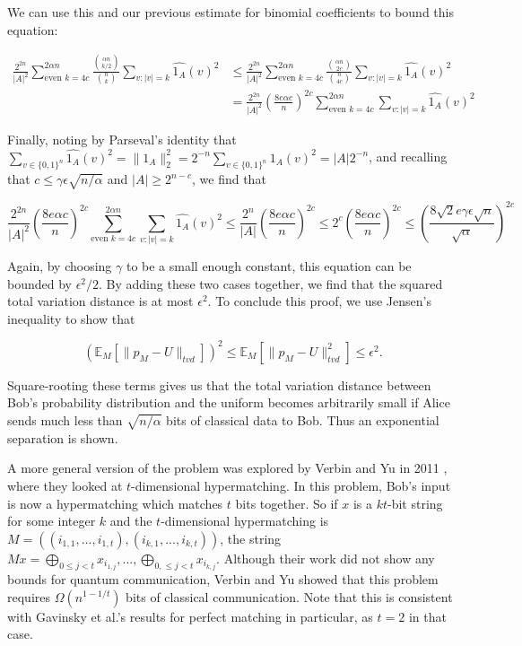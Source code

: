 \documentclass[a4paper]{article}
\begin{document}
        We can use this and our previous estimate for binomial coefficients to bound this equation:

        \begin{align*}
            \frac{2^{2n}}{|A|^2}\sum_{\textrm{even }k=4c}^{2\alpha n}\frac{\binom{\alpha n}{k/2}}{\binom{n}{k}}\sum_{v:|v| = k}\widehat{1_A}(v)^2 &\leq \frac{2^{2n}}{|A|^2}\sum_{\textrm{even }k=4c}^{2\alpha n}\frac{\binom{\alpha n}{2c}}{\binom{n}{4c}}\sum_{v:|v| = k}\widehat{1_A}(v)^2\\
            &= \frac{2^{2n}}{|A|^2}\left(\frac{8 e\alpha c}{n}\right)^{2c}\sum_{\textrm{even }k=4c}^{2\alpha n}\sum_{v:|v| = k}\widehat{1_A}(v)^2
        \end{align*}

        Finally, noting by Parseval's identity that $\sum_{v \in \{0, 1\}^n}\widehat{1_A}(v)^2 = \|1_A\|_2^2 = 2^{-n}\sum_{v \in \{0, 1\}^n}1_A(v)^2 = |A|2^{-n}$, and recalling that $c \leq \gamma \epsilon \sqrt{n/\alpha}$ and $|A| \geq 2^{n-c}$, we find that

        $$\frac{2^{2n}}{|A|^2}\left(\frac{8 e\alpha c}{n}\right)^{2c}\sum_{\textrm{even }k=4c}^{2\alpha n}\sum_{v:|v| = k}\widehat{1_A}(v)^2 \leq \frac{2^n}{|A|}\left(\frac{8 e\alpha c}{n}\right)^{2c} \leq 2^c\left(\frac{8 e\alpha c}{n}\right)^{2c} \leq \left(\frac{8\sqrt{2} e\gamma\epsilon\sqrt{n}}{\sqrt{\alpha}}\right)^{2c}$$

        Again, by choosing $\gamma$ to be a small enough constant, this equation can be bounded by $\epsilon^2/2$. By adding these two cases together, we find that the squared total variation distance is at most $\epsilon^2$. To conclude this proof, we use Jensen's inequality to show that

        $$(\mathbb{E}_M[\|p_M - U\|_{tvd}])^2 \leq \mathbb{E}_M[\|p_M - U\|_{tvd}^2] \leq \epsilon^2.$$

        Square-rooting these terms gives us that the total variation distance between Bob's probability distribution and the uniform becomes arbitrarily small if Alice sends much less than $\sqrt{n/\alpha}$ bits of classical data to Bob. Thus an exponential separation is shown.

        A more general version of the problem was explored by Verbin and Yu in 2011 \cite{Verbin:2011:SCC:2133036.2133038}, where they looked at $t$-dimensional hypermatching. In this problem, Bob's input is now a hypermatching which matches $t$ bits together. So if $x$ is a $kt$-bit string for some integer $k$ and the $t$-dimensional hypermatching is $M = ((i_{1,1},...,i_{1,t}),(i_{k, 1},...,i_{k, t}))$, the string $Mx = \bigoplus_{0 \leq j < t}x_{i_{1, j}},...,\bigoplus_{0, \leq j < t}x_{i_{k, j}}$. Although their work did not show any bounds for quantum communication, Verbin and Yu showed that this problem requires $\Omega(n^{1-1/t})$ bits of classical communication. Note that this is consistent with Gavinsky et al.'s results for perfect matching in particular, as $t=2$ in that case.
\end{document}
